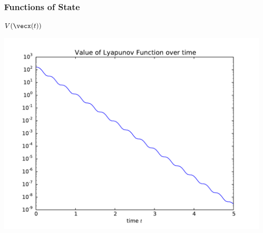 \documentclass[12pt]{beamer}
\begin{document}
\begin{frame}
\frametitle{Functions of State}

\centering
$V(\vecx(t))$

\includegraphics[width=.8\linewidth]{smd_Vt}

\end{frame}
\end{document}
